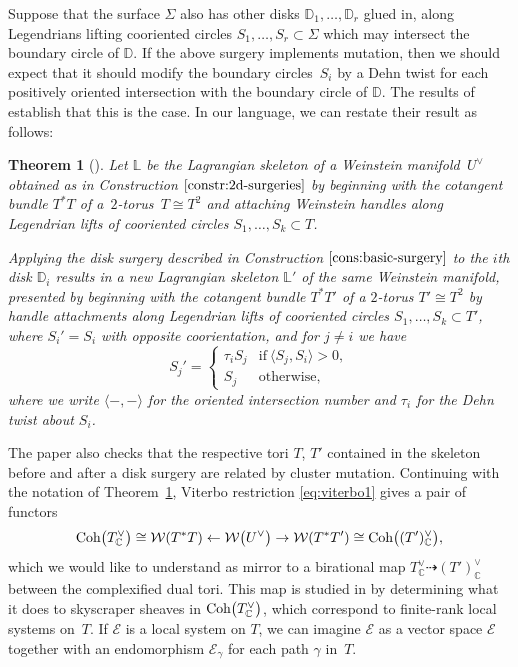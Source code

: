 \documentclass[pdftex]{sigma}%
\numberwithin{equation}{section}
\newtheorem{Theorem}{Theorem}[section]
\def\CC{\mathbb{C}}
\def\DD{\mathbb{D}}
\def\LL{\mathbb{L}}
\def\cW{\mathcal{W}}
\def\cE{\mathcal{E}}
\newcommand{\Coh}{\textup{Coh}}
\begin{document}
Suppose that the surface $\Sigma$ also has other disks $\DD_1,\dots,\DD_r$ glued in, along Legendrians lifting cooriented circles $S_1,\dots,S_r\subset \Sigma$ which may intersect the boundary circle of $\DD$. If the above surgery implements mutation, then we should expect that it should modify the boundary circles~$S_i$ by a Dehn twist for each positively oriented intersection with the boundary circle of $\DD$. The results of \cite{STW} establish that this is the case. In our language, we can restate their result as follows:

\begin{Theorem}[{\cite[Theorem 5.7]{STW}}]\label{thm:stw-mutations}
Let $\LL$ be the Lagrangian skeleton of a Weinstein mani\-fold~$U^\vee$ obtained as in Construction $\ref{constr:2d-surgeries}$ by beginning with the cotangent bundle $T^*T$ of a~$2$-torus~$T\cong T^2$ and attaching Weinstein handles along Legendrian lifts of cooriented circles $S_1,\dots,S_k\subset T$.

Applying the disk surgery described in Construction $\ref{cons:basic-surgery}$ to the $i$th disk $\DD_i$ results in a new Lagrangian skeleton $\LL'$ of the same Weinstein manifold, presented by beginning with the cotangent bundle $T^*T'$ of a $2$-torus $T'\cong T^2$ by handle attachments along Legendrian lifts of cooriented circles $S_1,\dots,S_k\subset T'$, where $S_i'=S_i$ with opposite coorientation, and for $j\neq i$ we have
\[
	S_j' = \begin{cases} \tau_iS_j&\text{if}\ \langle S_j, S_i\rangle >0,\\
	 S_j&\text{otherwise},\end{cases}
\]
where we write $\langle -,-\rangle$ for the oriented intersection number and $\tau_i$ for the Dehn twist about $S_i$.
\end{Theorem}

The paper \cite{STW} also checks that the respective tori $T$, $T'$ contained in the skeleton before and after a disk surgery are related by cluster mutation. Continuing with the notation of Theorem~\ref{thm:stw-mutations}, Viterbo restriction \eqref{eq:viterbo1} gives a pair of functors
\begin{equation}
 \Coh\big(T_\CC^\vee\big)\cong\cW(T^*T)\gets \cW\big(U^\vee\big)\to\cW(T^*T')\cong \Coh\big( (T')^\vee_\CC\big),
 \label{eq:viterbo2}
\end{equation}
which we would like to understand as mirror to a birational map $T_\CC^\vee\dashrightarrow(T')^\vee_\CC$ between the complexified dual tori. This map is studied in \cite{STW} by determining what it does to skyscraper sheaves in $\Coh\big(T_\CC^\vee\big)$, which correspond to finite-rank local systems on~$T$. If $\cE$ is a local system on $T$, we can imagine $\cE$ as a vector space $\cE$ together with an endomorphism $\cE_\gamma$ for each path $\gamma$ in~$T$.
\end{document}
